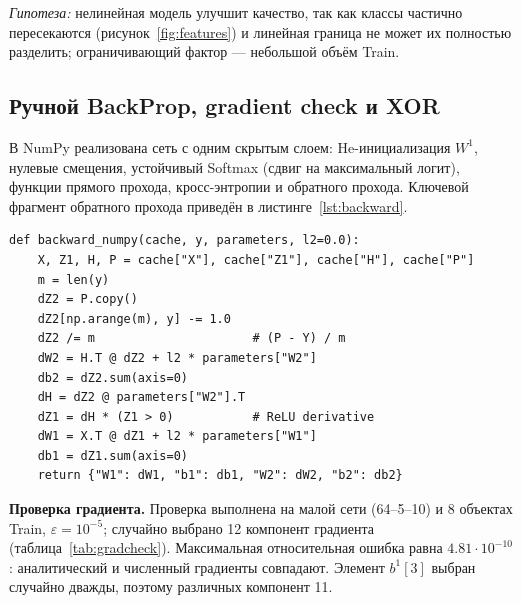 \documentclass[oneside,a4paper,14pt]{extarticle}
\begin{document}
\textit{Гипотеза:} нелинейная модель улучшит качество, так как классы частично пересекаются (рисунок~\ref{fig:features}) и линейная граница не может их полностью разделить; ограничивающий фактор --- небольшой объём Train.

\subsection{Ручной BackProp, gradient check и XOR}
В NumPy реализована сеть с одним скрытым слоем: He-инициализация $W^1$, нулевые смещения, устойчивый Softmax (сдвиг на максимальный логит), функции прямого прохода, кросс-энтропии и обратного прохода. Ключевой фрагмент обратного прохода приведён в листинге~\ref{lst:backward}.

\begin{listing}[ht]
\begin{verbatim}
def backward_numpy(cache, y, parameters, l2=0.0):
    X, Z1, H, P = cache["X"], cache["Z1"], cache["H"], cache["P"]
    m = len(y)
    dZ2 = P.copy()
    dZ2[np.arange(m), y] -= 1.0
    dZ2 /= m                      # (P - Y) / m
    dW2 = H.T @ dZ2 + l2 * parameters["W2"]
    db2 = dZ2.sum(axis=0)
    dH = dZ2 @ parameters["W2"].T
    dZ1 = dH * (Z1 > 0)           # ReLU derivative
    dW1 = X.T @ dZ1 + l2 * parameters["W1"]
    db1 = dZ1.sum(axis=0)
    return {"W1": dW1, "b1": db1, "W2": dW2, "b2": db2}
\end{verbatim}
\caption{Обратный проход двухслойной сети (NumPy)}
\label{lst:backward}
\end{listing}

\newpage

\textbf{Проверка градиента.} Проверка выполнена на малой сети (64--5--10) и 8 объектах Train, $\varepsilon = 10^{-5}$; случайно выбрано 12 компонент градиента (таблица~\ref{tab:gradcheck}). Максимальная относительная ошибка равна $4.81\cdot10^{-10}$: аналитический и численный градиенты совпадают. Элемент $b^1[3]$ выбран случайно дважды, поэтому различных компонент 11.
\end{document}
